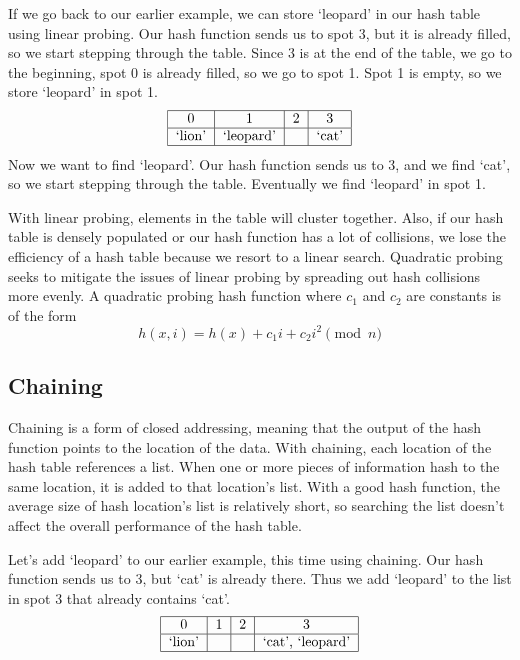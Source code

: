 If we go back to our earlier example, we can store `leopard' in our hash table using linear probing.
Our hash function sends us to spot 3, but it is already filled, so we start stepping through the table.
Since 3 is at the end of the table, we go to the beginning, spot 0 is already filled, so we go to spot 1.
Spot 1 is empty, so we store `leopard' in spot 1.
\[
\begin{tabular}{|c|c|c|c|}
\hline
0 & 1 & 2 & 3\\
\hline
`lion' & `leopard' & & `cat' \\
\hline
\end{tabular}
\]
Now we want to find `leopard'.
Our hash function sends us to 3, and we find `cat', so we start stepping through the table.
Eventually we find `leopard' in spot 1.


With linear probing, elements in the table will cluster together.
Also, if our hash table is densely populated or our hash function has a lot of collisions, we lose the efficiency of a hash table because we resort to a linear search.
Quadratic probing seeks to mitigate the issues of linear probing by spreading out hash collisions more evenly.
A quadratic probing hash function where $c_1$ and $c_2$ are constants is of the form
\begin{equation*}
h(x, i) = h(x) + c_1i + c_2i^2 \pmod{n}
\end{equation*}

\subsection*{Chaining}
Chaining is a form of closed addressing, meaning that the output of the hash function points to the location of the data.
With chaining, each location of the hash table references a list.
When one or more pieces of information hash to the same location, it is added to that location's list.
With a good hash function, the average size of hash location's list is relatively short, so searching the list doesn't affect the overall performance of the hash table.

Let's add `leopard' to our earlier example, this time using chaining.
Our hash function sends us to 3, but `cat' is already there.
Thus we add `leopard' to the list in spot 3 that already contains `cat'.
\[
\begin{tabular}{|c|c|c|c|}
\hline
0 & 1 & 2 & 3\\
\hline
`lion' & & & `cat', `leopard' \\
\hline
\end{tabular}
\]

